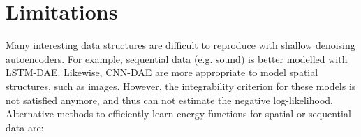 
\section{Limitations}

Many interesting data structures are difficult to reproduce with shallow denoising autoencoders. For example, sequential data (e.g. sound) is better modelled with LSTM-DAE. Likewise, CNN-DAE are more appropriate to model spatial structures, such as images. However, the integrability criterion for these models is not satisfied anymore, and thus can not estimate the negative log-likelihood. Alternative methods to efficiently learn energy functions for spatial or sequential data are: \citep{anomaly-detection-energy, energy-estimation}